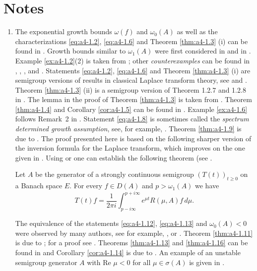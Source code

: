 \section*{Notes}
\begin{enumerate}[label=\emph{Section \arabic*:}, wide, itemsep=1ex]

\item 
The exponential growth bounds $\omega(f)$ and $\omega_{0}(A)$ as well as the characterizations \eqref{eq:a4-1.2}, \eqref{eq:a4-1.6} and Theorem \ref{thm:a4-1.3} (i) can be found in \citet{hillephillips:1957}.
Growth bounds similar to $\omega_{1}(A)$ were first considered in \citet{djacenko:1976} and in \citet[Proposition~2]{zabczyk:1979}. 
Example \ref{ex:a4-1.2}(2) is taken from \citet{wolff:1981}; other \emph{counterexamples} can be found in \citet{hillephillips:1957}, \citet{foias:1973}, \citet{triggiani:1975a}, 
\citet{zabczyk:1975} and \citet{greineretal:1981}. 
Statements \eqref{eq:a4-1.2}, \eqref{eq:a4-1.6} and Theorem \ref{thm:a4-1.3} (i) are semigroup versions of results in classical Laplace transform theory, see \citet{hillephillips:1957} and \citet{widder:1946}. 
Theorem \ref{thm:a4-1.3} (ii) is a semigroup version of Theorem 1.2.7 and 1.2.8 in \citet{doetsch:1950}. 
The lemma in the proof of Theorem \ref{thm:a4-1.3} is taken from \citet{milstein:1975}. 
Theorem \ref{thm:a4-1.4} and Corollary \ref{cor:a4-1.5} can be found in \citet{neubrander:1985a}. 
Example \ref{ex:a4-1.6} follows Remark~2 in \citet{zabczyk:1975}. 
Statement \eqref{eq:a4-1.8} is sometimes called the \emph{spectrum determined growth assumption}, see, for example, \citet{triggiani:1975b}. 
Theorem \ref{thm:a4-1.9} is due to \citet{slemrod:1976}. 
The proof presented here is based on the following sharper version of the inversion formula for the Laplace transform, which improves on the one given in \citet[p.349]{hillephillips:1957}. 
Using \citet[p.66]{widder:1946} or \citet[p.212]{doetsch:1950} one can establish the following theorem (see \citet{neubrander:1984b}.

\begin{theorem}\label{thm:a4-2.6}
Let $A$ be the generator of a strongly continuous semigroup $(T(t))_{t \geq 0}$ on a Banach space $E$. 
For every $f \in D(A)$ and $p > \omega_{1}(A)$ we have
\[
T(t)f = \frac{1}{2\pi i} \int_{p-i\infty}^{p+i\infty} e^{\mu t}R(\mu,A)f \, d\mu.
\]
\end{theorem}


The equivalence of the statements \eqref{eq:a4-1.12}, \eqref{eq:a4-1.13} and \emph{$\omega_{0}(A) < 0$} were observed by many authors, see for example, \citet[p.178]{balakrishnan:1976}, 
or \citet{benchimol:1978b}. 
Theorem \ref{thm:a4-1.11} is due to \citet{datko:1970};
for a proof see \citet[p.116]{pazy:1983}. 
Theorems \ref{thm:a4-1.13} and \ref{thm:a4-1.16} can be found in \citet{neubrander:1985b} and Corollary \ref{cor:a4-1.14} is due to \citet{komatsu:1969}. 
An example of an unstable semigroup generator $A$ with Re $\mu < 0$ for all $\mu \in \sigma(A)$ is given in \citet{datko:1983}.


\end{enumerate}
